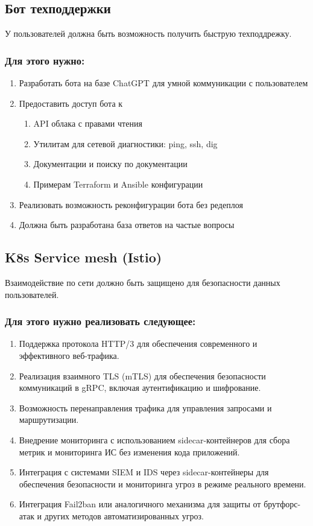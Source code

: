 \documentclass[14pt, a4paper]{extarticle}
\begin{document}
\subsection{Бот техподдержки}

У пользователей должна быть возможность получить быструю техподдрежку.

\subsubsection*{Для этого нужно:}

\begin{enumerate}
\item Разработать бота на базе ChatGPT для умной коммуникации с пользователем
\item Предоставить доступ бота к
\begin{enumerate}
\item API облака с правами чтения
\item Утилитам для сетевой диагностики: ping, ssh, dig
\item Документации и поиску по документации
\item Примерам Terraform и Ansible конфигурации
\end{enumerate}
\item Реализовать возможность реконфигурации бота без редеплоя
\item Должна быть разработана база ответов на частые вопросы
\end{enumerate}

\subsection{K8s Service mesh (Istio)}

Взаимодействие по сети должно быть защищено для безопасности данных пользователей.

\subsubsection*{Для этого нужно реализовать следующее:}

\begin{enumerate}
\item Поддержка протокола HTTP/3 для обеспечения современного и эффективного веб-трафика.
\item Реализация взаимного TLS (mTLS) для обеспечения безопасности коммуникаций в gRPC, включая аутентификацию и шифрование.
\item Возможность перенаправления трафика для управления запросами и маршрутизации.
\item Внедрение мониторинга с использованием sidecar-контейнеров для сбора метрик и мониторинга ИС без изменения кода приложений.
\item Интеграция с системами SIEM и IDS через sidecar-контейнеры для обеспечения безопасности и мониторинга угроз в режиме реального времени.
\item Интеграция Fail2ban или аналогичного механизма для защиты от брутфорс-атак и других методов автоматизированных угроз.
\end{enumerate}
\end{document}
